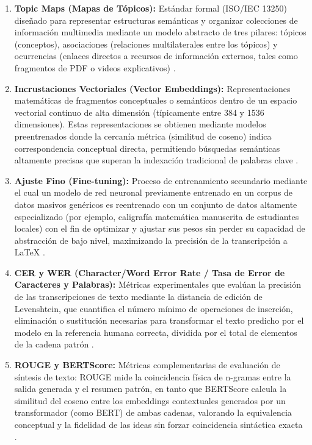 \begin{enumerate}[label=\alph*), leftmargin=*]
  \item \textbf{Topic Maps (Mapas de Tópicos):} Estándar formal (ISO/IEC 13250) diseñado para representar estructuras semánticas y organizar colecciones de información multimedia mediante un modelo abstracto de tres pilares: tópicos (conceptos), asociaciones (relaciones multilaterales entre los tópicos) y ocurrencias (enlaces directos a recursos de información externos, tales como fragmentos de PDF o videos explicativos) \parencite{Obionwu2022, Jiang2025}.

  \item \textbf{Incrustaciones Vectoriales (Vector Embeddings):} Representaciones matemáticas de fragmentos conceptuales o semánticos dentro de un espacio vectorial continuo de alta dimensión (típicamente entre 384 y 1536 dimensiones). Estas representaciones se obtienen mediante modelos preentrenados donde la cercanía métrica (similitud de coseno) indica correspondencia conceptual directa, permitiendo búsquedas semánticas altamente precisas que superan la indexación tradicional de palabras clave \parencite{KleselWittmannRAG2025}.

  \item \textbf{Ajuste Fino (Fine-tuning):} Proceso de entrenamiento secundario mediante el cual un modelo de red neuronal previamente entrenado en un corpus de datos masivos genéricos es reentrenado con un conjunto de datos altamente especializado (por ejemplo, caligrafía matemática manuscrita de estudiantes locales) con el fin de optimizar y ajustar sus pesos sin perder su capacidad de abstracción de bajo nivel, maximizando la precisión de la transcripción a \LaTeX{} \parencite{AlvarezPerez2026}.

  \item \textbf{CER y WER (Character/Word Error Rate / Tasa de Error de Caracteres y Palabras):} Métricas experimentales que evalúan la precisión de las transcripciones de texto mediante la distancia de edición de Levenshtein, que cuantifica el número mínimo de operaciones de inserción, eliminación o sustitución necesarias para transformar el texto predicho por el modelo en la referencia humana correcta, dividida por el total de elementos de la cadena patrón \parencite{AlHitawi2026}.

  \item \textbf{ROUGE y BERTScore:} Métricas complementarias de evaluación de síntesis de texto: ROUGE mide la coincidencia física de n-gramas entre la salida generada y el resumen patrón, en tanto que BERTScore calcula la similitud del coseno entre los embeddings contextuales generados por un transformador (como BERT) de ambas cadenas, valorando la equivalencia conceptual y la fidelidad de las ideas sin forzar coincidencia sintáctica exacta \parencite{Saxena2025}.


\end{enumerate}
